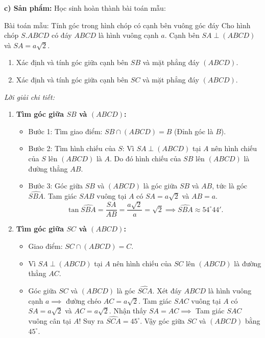 \documentclass[12pt, a4paper]{article}
\begin{document}
\noindent \textbf{c) Sản phẩm:}
Học sinh hoàn thành bài toán mẫu:
\begin{pedabox}{Bài toán mẫu: Tính góc trong hình chóp có cạnh bên vuông góc đáy}
Cho hình chóp $S.ABCD$ có đáy $ABCD$ là hình vuông cạnh $a$. Cạnh bên $SA \perp (ABCD)$ và $SA = a\sqrt{2}$.
\begin{enumerate}[leftmargin=0.6cm]
    \item Xác định và tính góc giữa cạnh bên $SB$ và mặt phẳng đáy $(ABCD)$.
    \item Xác định và tính góc giữa cạnh bên $SC$ và mặt phẳng đáy $(ABCD)$.
\end{enumerate}
\end{pedabox}
\textit{Lời giải chi tiết:}
\begin{enumerate}[leftmargin=0.6cm]
    \item \textbf{Tìm góc giữa $SB$ và $(ABCD)$:}
    \begin{itemize}
        \item Bước 1: Tìm giao điểm: $SB \cap (ABCD) = B$ (Đỉnh góc là $B$).
        \item Bước 2: Tìm hình chiếu của $S$: Vì $SA \perp (ABCD)$ tại $A$ nên hình chiếu của $S$ lên $(ABCD)$ là $A$.
        Do đó hình chiếu của $SB$ lên $(ABCD)$ là đường thẳng $AB$.
        \item Bước 3: Góc giữa $SB$ và $(ABCD)$ là góc giữa $SB$ và $AB$, tức là góc $\widehat{SBA}$.
        Tam giác $SAB$ vuông tại $A$ có $SA = a\sqrt{2}$ và $AB = a$.
        $$\tan \widehat{SBA} = \dfrac{SA}{AB} = \dfrac{a\sqrt{2}}{a} = \sqrt{2} \implies \widehat{SBA} \approx 54^\circ 44'.$$
    \end{itemize}
    \item \textbf{Tìm góc giữa $SC$ và $(ABCD)$:}
    \begin{itemize}
        \item Giao điểm: $SC \cap (ABCD) = C$.
        \item Vì $SA \perp (ABCD)$ tại $A$ nên hình chiếu của $SC$ lên $(ABCD)$ là đường thẳng $AC$.
        \item Góc giữa $SC$ và $(ABCD)$ là góc $\widehat{SCA}$.
        Xét đáy $ABCD$ là hình vuông cạnh $a \implies$ đường chéo $AC = a\sqrt{2}$.
        Tam giác $SAC$ vuông tại $A$ có $SA = a\sqrt{2}$ và $AC = a\sqrt{2}$.
        Nhận thấy $SA = AC \implies$ Tam giác $SAC$ vuông cân tại $A$!
        Suy ra $\widehat{SCA} = 45^\circ$.
        Vậy góc giữa $SC$ và $(ABCD)$ bằng $45^\circ$.
    \end{itemize}
\end{enumerate}
\end{document}
